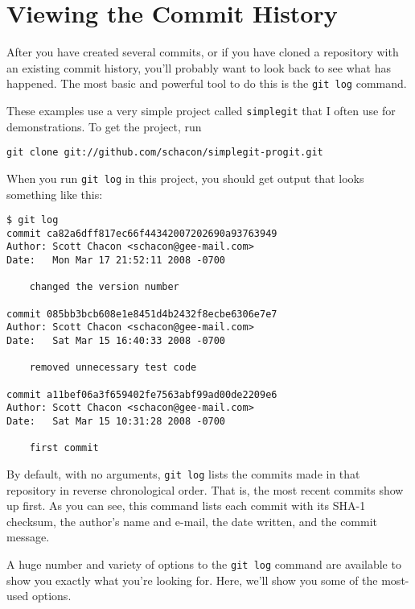 \documentclass[a4paper]{book}
\begin{document}
\section{Viewing the Commit History}\label{viewing-the-commit-history}

After you have created several commits, or if you have cloned a repository with an existing commit history, you'll probably want to look back to see what has happened. The most basic and powerful tool to do this is the \texttt{git log} command.

These examples use a very simple project called \texttt{simplegit} that I often use for demonstrations. To get the project, run

\begin{shaded}\begin{verbatim}
git clone git://github.com/schacon/simplegit-progit.git
\end{verbatim}\end{shaded}

When you run \texttt{git log} in this project, you should get output that looks something like this:

\begin{shaded}\begin{verbatim}
$ git log
commit ca82a6dff817ec66f44342007202690a93763949
Author: Scott Chacon <schacon@gee-mail.com>
Date:   Mon Mar 17 21:52:11 2008 -0700

    changed the version number

commit 085bb3bcb608e1e8451d4b2432f8ecbe6306e7e7
Author: Scott Chacon <schacon@gee-mail.com>
Date:   Sat Mar 15 16:40:33 2008 -0700

    removed unnecessary test code

commit a11bef06a3f659402fe7563abf99ad00de2209e6
Author: Scott Chacon <schacon@gee-mail.com>
Date:   Sat Mar 15 10:31:28 2008 -0700

    first commit
\end{verbatim}\end{shaded}

By default, with no arguments, \texttt{git log} lists the commits made in that repository in reverse chronological order. That is, the most recent commits show up first. As you can see, this command lists each commit with its SHA-1 checksum, the author's name and e-mail, the date written, and the commit message.

A huge number and variety of options to the \texttt{git log} command are available to show you exactly what you're looking for. Here, we'll show you some of the most-used options.
\end{document}
